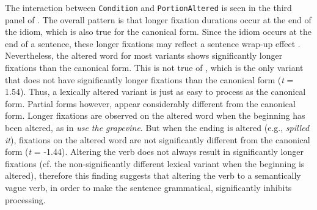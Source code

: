 \documentclass[output=paper
,modfonts
,nonflat]{langsci/langscibook}
\begin{document}
The interaction between \texttt{Condition} and \texttt{PortionAltered} is seen in the third panel of . The overall pattern is that longer fixation durations occur at the end of the idiom, which is also true for the canonical form. Since the idiom occurs at the end of a sentence, these longer fixations may reflect a sentence wrap-up effect \citep{RaynerEtAl2000, HirotaniEtAl2006}. Nevertheless, the altered word for most variants shows significantly longer fixations than the canonical form. This is not true of , which is the only variant that does not have significantly longer fixations than the canonical form (\textit{t} = 1.54). Thus, a lexically altered variant is just as easy to process  as the canonical form. Partial forms  however, appear considerably different from the canonical form. Longer fixations are observed on the altered word when the beginning has been altered, as in \textit{use the grapevine}. But when the ending is altered (e.g., \textit{spilled it}), fixations on the altered word are not significantly different from the canonical form (\textit{t} = -1.44). Altering the verb does not always result in significantly longer fixations (cf. the non-significantly different lexical variant when the beginning is altered), therefore this finding suggests that altering the verb to a semantically vague verb, in order to make the sentence grammatical, significantly inhibits processing.
\end{document}
